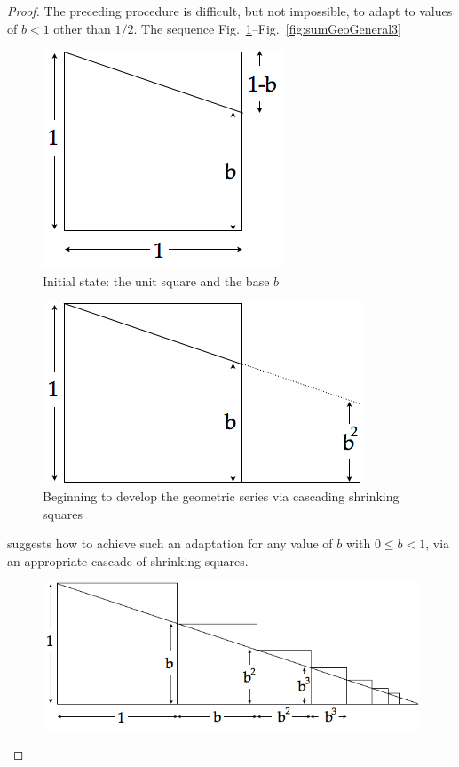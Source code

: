 \begin{proof}
The preceding procedure is difficult, but not impossible, to adapt to values of $b <1$ other than $1/2$.  The sequence Fig.~\ref{fig:sumGeoGeneral1}--Fig.~\ref{fig:sumGeoGeneral3}
\begin{figure}[htb]
\begin{center}
       \includegraphics[scale=0.35]{FiguresMaths/SumGeometricGeneral1}
\caption{Initial state: the unit square and the base $b$}
       \label{fig:sumGeoGeneral1}
\end{center}
\end{figure}
\begin{figure}[htb]
\begin{center}
       \includegraphics[scale=0.35]{FiguresMaths/SumGeometricGeneral2}
\caption{Beginning to develop the geometric series via cascading shrinking squares}
       \label{fig:sumGeoGeneral2}
\end{center}
\end{figure}
suggests how to achieve such an adaptation for any value of $b$ with $0 \leq b <1$, via an appropriate cascade of shrinking squares.
\begin{figure}[ht]
\begin{center}
       \includegraphics[scale=0.35]{FiguresMaths/SumGeometricGeneral3}

\end{center}
\end{figure}
\end{proof}
